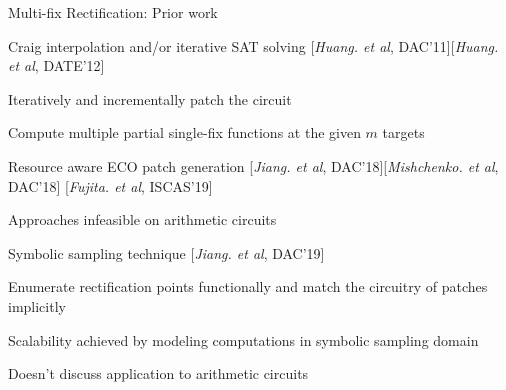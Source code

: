 \begin{frame}{\large Multi-fix Rectification: Prior work}

% 
\bi
\item Craig interpolation and/or iterative SAT solving [{\it Huang. et al}, DAC'11][{\it Huang. et al}, DATE'12]
\bi
	\item Iteratively and incrementally patch the circuit
	\item Compute multiple partial single-fix functions at the given $m$ targets
\ei
\item Resource aware ECO patch generation [{\it Jiang. et al}, DAC'18][{\it Mishchenko. et al}, DAC'18]
		[{\it Fujita. et al}, ISCAS'19]
\item Approaches infeasible on arithmetic circuits
\item Symbolic sampling technique [{\it Jiang. et al}, DAC'19]
\bi
	\item Enumerate rectification points functionally and match the circuitry of patches implicitly
	\item Scalability achieved by modeling computations in symbolic sampling domain
	\item Doesn't discuss application to arithmetic circuits
\ei
\ei
\end{frame}


